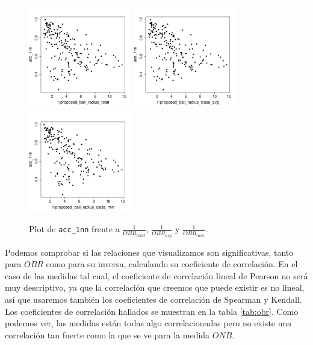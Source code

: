 \documentclass[a4paper,12pt]{report}
\theoremstyle{definition}
\begin{document}
\begin{figure}[H]
  \centering
  \includegraphics[width=0.4\textwidth]{plots/proposed/1nn_vs_inverted_proposed_ball_radius_total}
  \includegraphics[width=0.4\textwidth]{plots/proposed/1nn_vs_inverted_proposed_ball_radius_class_avg}
  \includegraphics[width=0.4\textwidth]{plots/proposed/1nn_vs_inverted_proposed_ball_radius_class_min}
  \caption{Plot de \texttt{acc\_1nn} frente a $\frac{1}{OBR_{total}}$, $\frac{1}{OBR_{avg}}$ y $\frac{1}{OBR_{min}}$.}
  \label{fig:invobr}
\end{figure}

Podemos comprobar si las relaciones que visualizamos son significativas, tanto para $OBR$ como para su inversa, calculando su coeficiente de correlación. En el caso de las medidas tal cual, el coeficiente de correlación lineal de Pearson no será muy descriptivo, ya que la correlación que creemos que puede existir es no lineal, así que usaremos también los coeficientes de correlación de Spearman y Kendall. Los coeficientes de correlación hallados se muestran en la tabla \ref{tab:obr}. Como podemos ver, las medidas están todas algo correlacionadas pero no existe una correlación tan fuerte como la que se ve para la medida $ONB$.
\end{document}
